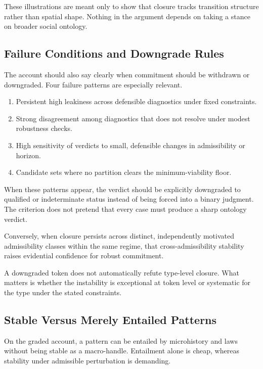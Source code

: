 These illustrations are meant only to show that closure tracks
transition structure rather than spatial shape. Nothing in the argument depends
on taking a stance on broader social ontology.

\subsection{Failure Conditions and Downgrade
	Rules}\label{failure-conditions-and-downgrade-rules}

The account should also say clearly when commitment should be
withdrawn or downgraded. Four failure patterns are especially relevant.

\begin{enumerate}
	\item
	      Persistent high leakiness across defensible diagnostics under fixed
	      constraints.
	\item
	      Strong disagreement among diagnostics that does not resolve under
	      modest robustness checks.
	\item
	      High sensitivity of verdicts to small, defensible changes in
	      admissibility or horizon.
	\item
	      Candidate sets where no partition clears the
	      minimum-viability floor.
\end{enumerate}

When these patterns appear, the verdict should be explicitly downgraded
to qualified or indeterminate status instead of being forced into a
binary judgment. The criterion does not pretend that every case must
produce a sharp ontology verdict.

Conversely, when closure persists across distinct, independently
motivated admissibility classes within the same regime, that
cross-admissibility stability raises evidential confidence for robust
commitment.

A downgraded token does not automatically refute type-level closure.
What matters is whether the instability is exceptional at token level
or systematic for the type under the stated constraints.

\subsection{Stable Versus Merely Entailed
	Patterns}\label{stable-versus-merely-entailed-patterns}

On the graded account, a pattern can be entailed by microhistory and
laws without being stable as a macro-handle. Entailment alone is cheap,
whereas stability under admissible perturbation is demanding.


